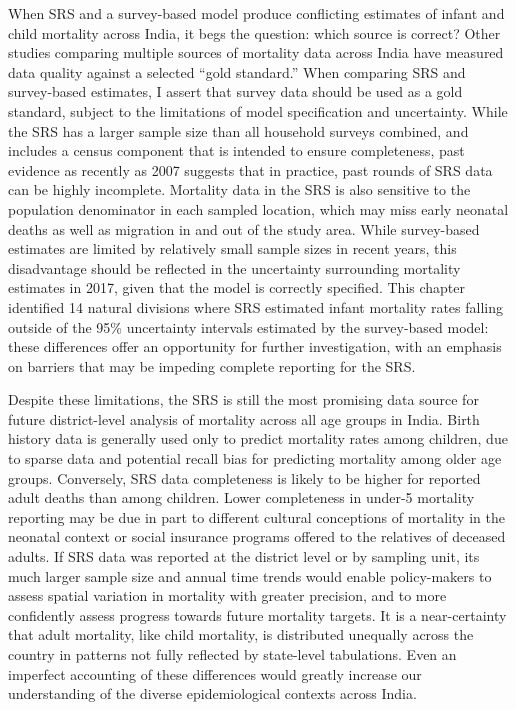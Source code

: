\documentclass[
]{report}
\begin{document}
When SRS and a survey-based model produce conflicting estimates of infant and child mortality across India, it begs the question: which source is correct? Other studies comparing multiple sources of mortality data across India have measured data quality against a selected ``gold standard.''\autocite{Kumar2019} When comparing SRS and survey-based estimates, I assert that survey data should be used as a gold standard, subject to the limitations of model specification and uncertainty. While the SRS has a larger sample size than all household surveys combined, and includes a census component that is intended to ensure completeness, past evidence as recently as 2007 suggests that in practice, past rounds of SRS data can be highly incomplete.\autocite{Bhat2002,Mahapatra2010} Mortality data in the SRS is also sensitive to the population denominator in each sampled location, which may miss early neonatal deaths as well as migration in and out of the study area. While survey-based estimates are limited by relatively small sample sizes in recent years, this disadvantage should be reflected in the uncertainty surrounding mortality estimates in 2017, given that the model is correctly specified. This chapter identified 14 natural divisions where SRS estimated infant mortality rates falling outside of the 95\% uncertainty intervals estimated by the survey-based model: these differences offer an opportunity for further investigation, with an emphasis on barriers that may be impeding complete reporting for the SRS.

Despite these limitations, the SRS is still the most promising data source for future district-level analysis of mortality across all age groups in India. Birth history data is generally used only to predict mortality rates among children, due to sparse data and potential recall bias for predicting mortality among older age groups.\autocite{Wakefield2019} Conversely, SRS data completeness is likely to be higher for reported adult deaths than among children. Lower completeness in under-5 mortality reporting may be due in part to different cultural conceptions of mortality in the neonatal context or social insurance programs offered to the relatives of deceased adults.\autocite{Kumar2019} If SRS data was reported at the district level or by sampling unit, its much larger sample size and annual time trends would enable policy-makers to assess spatial variation in mortality with greater precision, and to more confidently assess progress towards future mortality targets. It is a near-certainty that adult mortality, like child mortality, is distributed unequally across the country in patterns not fully reflected by state-level tabulations. Even an imperfect accounting of these differences would greatly increase our understanding of the diverse epidemiological contexts across India.
\end{document}
